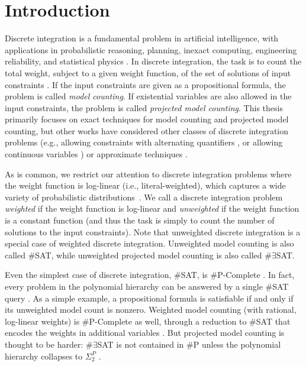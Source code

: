 \chapter{Introduction}
\label{ch:intro}
Discrete integration is a fundamental problem in artificial intelligence, with applications in probabilistic reasoning, planning, inexact computing, engineering reliability, and statistical physics \cite{Bacchus2003,DH07,GSS08,naveh2007constraint}. In discrete integration, the task is to count the total weight, subject to a given weight function, of the set of solutions of input constraints \cite{GSS08}. 
If the input constraints are given as a propositional formula, the problem is called \emph{model counting}. 
If existential variables are also allowed in the input constraints, the problem is called \emph{projected model counting}. This thesis primarily focuses on exact techniques for model counting and projected model counting, but other works have considered other classes of discrete integration problems (e.g., allowing constraints with alternating quantifiers \cite{stearns2002exploiting,KNR16}, or allowing continuous variables \cite{BPV15}) or approximate techniques \cite{CMV21}.

As is common, we restrict our attention to discrete integration problems where the weight function is log-linear (i.e., literal-weighted), which captures a wide variety of probabilistic distributions~\cite{KF09}.
We call a discrete integration problem \emph{weighted} if the weight function is log-linear and \emph{unweighted} if the weight function is a constant function (and thus the task is simply to count the number of solutions to the input constraints).
Note that unweighted discrete integration is a special case of weighted discrete integration.
Unweighted model counting is also called \#SAT, while unweighted projected model counting is also called $\#\exists$SAT.

Even the simplest case of discrete integration, \#SAT, is \#P-Complete \cite{Valiant79}. 
In fact, every problem in the polynomial hierarchy can be answered by a single \#SAT query \cite{toda89}. 
As a simple example, a propositional formula is satisfiable if and only if its unweighted model count is nonzero.
Weighted model counting (with rational, log-linear weights) is \#P-Complete as well, through a reduction to \#SAT that encodes the weights in additional variables \cite{CFMV15,DFM20}.
But projected model counting is thought to be harder: $\#\exists$SAT is not contained in $\#$P unless the polynomial hierarchy collapses to $\Sigma_2^P$ \cite{zawadzki2013generalization}.

